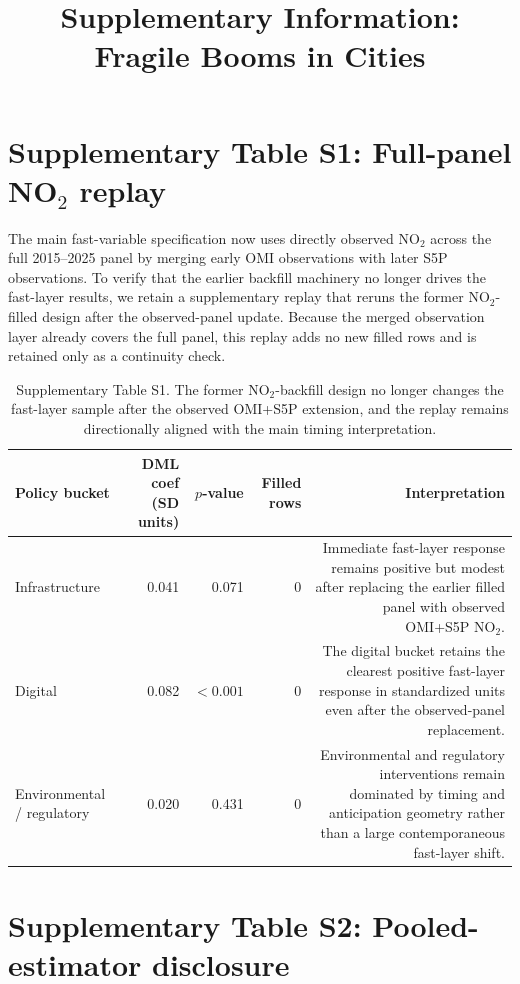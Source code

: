 \documentclass[oneside,pdflatex,sn-nature]{sn-jnl}
\title[Supplementary Information]{Supplementary Information: Fragile Booms in Cities}
\author[1]{\fnm{MACRO-City Engine Research} \sur{Team}}
\affil[1]{\orgname{MACRO-City Research Collaboration}, \orgaddress{\city{Global}, \country{International}}}
\begin{document}
\maketitle

\section{Supplementary Table S1: Full-panel NO$_2$ replay}

The main fast-variable specification now uses directly observed NO$_2$ across the full 2015--2025 panel by merging early OMI observations with later S5P observations.
To verify that the earlier backfill machinery no longer drives the fast-layer results, we retain a supplementary replay that reruns the former NO$_2$-filled design after the observed-panel update.
Because the merged observation layer already covers the full panel, this replay adds no new filled rows and is retained only as a continuity check.

\begin{table}[H]
\centering
\caption{Supplementary Table S1. The former NO$_2$-backfill design no longer changes the fast-layer sample after the observed OMI+S5P extension, and the replay remains directionally aligned with the main timing interpretation.}
\small
\setlength{\tabcolsep}{5pt}
\begin{tabular}{p{}rrrr}
\toprule
Policy bucket & DML coef (SD units) & $p$-value & Filled rows & Interpretation \\
\midrule
Infrastructure & 0.041 & 0.071 & 0 & Immediate fast-layer response remains positive but modest after replacing the earlier filled panel with observed OMI+S5P NO$_2$. \\
Digital & 0.082 & $<0.001$ & 0 & The digital bucket retains the clearest positive fast-layer response in standardized units even after the observed-panel replacement. \\
Environmental / regulatory & 0.020 & 0.431 & 0 & Environmental and regulatory interventions remain dominated by timing and anticipation geometry rather than a large contemporaneous fast-layer shift. \\
\bottomrule
\end{tabular}
\end{table}
\FloatBarrier

\section{Supplementary Table S2: Pooled-estimator disclosure}
\end{document}
